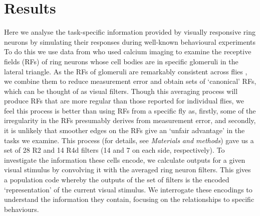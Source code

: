 \section*{Results}
Here we analyse the task-specific information provided by visually responsive ring neurons by simulating their responses during well-known behavioural experiments  To do this we use data from \cite{Seelig2013} who used calcium imaging to examine the receptive fields (RFs) of ring neurons whose cell bodies are in specific glomeruli in the lateral triangle. As the RFs of glomeruli are remarkably consistent across flies \cite{Seelig2013}, we combine them to reduce measurement error and obtain sets of ‘canonical’ RFs, which can be thought of as visual filters. Though this averaging process will produce RFs that are more regular than those reported for individual flies, we feel this process is better than using RFs from a specific fly as, firstly, some of the irregularity in the RFs presumably derives from measurement error, and secondly, it is unlikely that smoother edges on the RFs give an ‘unfair advantage’ in the tasks we examine. This process (for details, see \emph{Materials and methods}) gave us a set of 28 R2 and 14 R4d filters (14 and 7 on each side, respectively). To investigate the information these cells encode, we calculate outputs for a given visual stimulus by convolving it with the averaged ring neuron filters. This gives a population code whereby the outputs of the set of filters is the encoded ‘representation’ of the current visual stimulus. We interrogate these encodings to understand the information they contain, focusing on the relationships to specific behaviours.

